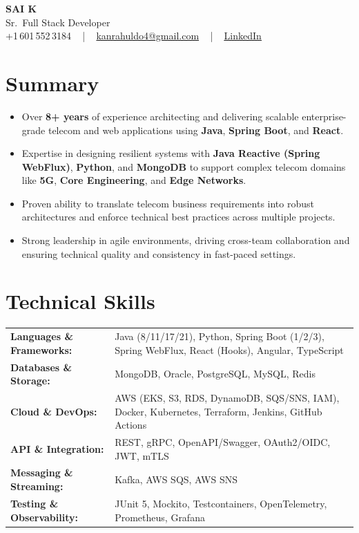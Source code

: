 \documentclass[letterpaper,11pt]{article}
\newcommand{\resumeItem}[1]{
  \item\footnotesize{
    {#1 \vspace{-2pt}}
  }
}
\newcommand{\resumeItemListStart}{\begin{itemize}[leftmargin=*]}
\newcommand{\resumeItemListEnd}{\end{itemize}\vspace{-5pt}}
\begin{document}
\begin{center}
    {\fontsize{14pt}{12pt}\selectfont \textbf{\MakeUppercase{Sai K}}}\\ \vspace{2pt}
    \fontsize{10pt}{12pt}\selectfont Sr.\ Full Stack Developer\\ \vspace{2pt}
    \fontsize{10pt}{12pt}\selectfont +1\,601\,552\,3184 ~ | ~
    \href{mailto:kanrahuldo4@gmail.com}{kanrahuldo4@gmail.com} ~ | ~
    \href{https://www.linkedin.com/in/srrrk/}{\color{blue}\underline{LinkedIn}}
    \vspace{-10pt}
\end{center}

\section{Summary}
\fontsize{9pt}{10pt}\selectfont
\resumeItemListStart
  \resumeItem{Over \textbf{8+ years} of experience architecting and delivering scalable enterprise-grade telecom and web applications using \textbf{Java}, \textbf{Spring Boot}, and \textbf{React}.}
  \resumeItem{Expertise in designing resilient systems with \textbf{Java Reactive (Spring WebFlux)}, \textbf{Python}, and \textbf{MongoDB} to support complex telecom domains like \textbf{5G}, \textbf{Core Engineering}, and \textbf{Edge Networks}.}
  \resumeItem{Proven ability to translate telecom business requirements into robust architectures and enforce technical best practices across multiple projects.}
  \resumeItem{Strong leadership in agile environments, driving cross-team collaboration and ensuring technical quality and consistency in fast-paced settings.}
\resumeItemListEnd
\vspace{-6pt}

\section{Technical Skills}
\vspace{-14pt}
\begin{table}[h]
\fontsize{9pt}{10pt}\selectfont
\begin{tabular}{p{0.3\linewidth} p{0.7\linewidth}}
\textbf{Languages \& Frameworks:} & Java (8/11/17/21), Python, Spring Boot (1/2/3), Spring WebFlux, React (Hooks), Angular, TypeScript \\
\textbf{Databases \& Storage:} & MongoDB, Oracle, PostgreSQL, MySQL, Redis \\
\textbf{Cloud \& DevOps:} & AWS (EKS, S3, RDS, DynamoDB, SQS/SNS, IAM), Docker, Kubernetes, Terraform, Jenkins, GitHub Actions \\
\textbf{API \& Integration:} & REST, gRPC, OpenAPI/Swagger, OAuth2/OIDC, JWT, mTLS \\
\textbf{Messaging \& Streaming:} & Kafka, AWS SQS, AWS SNS \\
\textbf{Testing \& Observability:} & JUnit 5, Mockito, Testcontainers, OpenTelemetry, Prometheus, Grafana \\
\end{tabular}
\end{table}
\vspace{-15pt}
\end{document}
